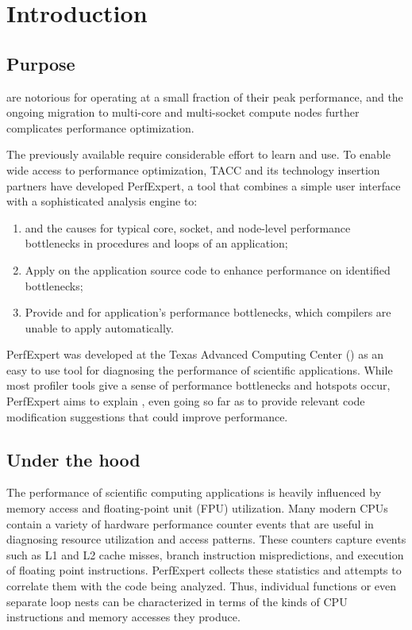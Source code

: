 \chapter{Introduction}
\label{ch:ch01_introduction}
\section{Purpose}
\label{sec:Purpose}

 are notorious for operating at a small fraction of their peak performance, and the ongoing migration to multi-core and multi-socket compute nodes further complicates performance optimization.

The previously available  require considerable effort to learn and use. To enable wide access to performance optimization, TACC and its technology insertion partners have developed PerfExpert, a tool that combines a simple user interface with a sophisticated analysis engine to:

\begin{enumerate}
  \item  {} and  the causes for typical core, socket, and node-level performance bottlenecks in procedures and loops of an application;
  \item  Apply  on the application source code to enhance performance on identified bottlenecks;
  \item  Provide  and  for application's performance bottlenecks, which compilers are unable to apply automatically.
\end{enumerate}

PerfExpert was developed at the Texas Advanced Computing Center () as an easy to use tool for diagnosing the performance of scientific applications. While most profiler tools give a sense of  performance bottlenecks and hotspots occur, PerfExpert aims to explain , even going so far as to provide relevant code modification suggestions that could improve performance.

\section{Under the hood}
\label{sec:Under_the_hood}

The performance of scientific computing applications is heavily influenced by memory access and floating-point unit (FPU) utilization. Many modern CPUs contain a variety of hardware performance counter events that are useful in diagnosing resource utilization and access patterns. These counters capture events such as L1 and L2 cache misses, branch instruction mispredictions, and execution of floating point instructions. PerfExpert collects these statistics and attempts to correlate them with the code being analyzed. Thus, individual functions or even separate loop nests can be characterized in terms of the kinds of CPU instructions and memory accesses they produce.

